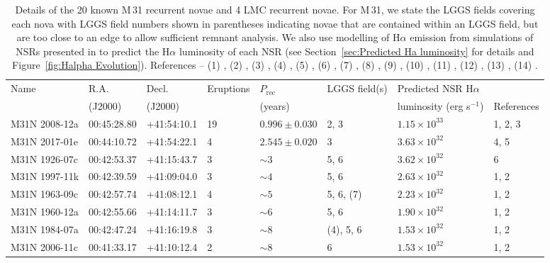 \documentclass[fleqn,usenatbib]{mnras}
\begin{document}
\begin{table}
\caption{Details of the 20 known M\,31 recurrent novae and 4 LMC recurrent novae. For M\,31, we state the LGGS fields covering each nova with LGGS field numbers shown in parentheses indicating novae that are contained within an LGGS field, but are too close to an edge to allow sufficient remnant analysis. We also use modelling of H$\alpha$ emission from simulations of NSRs presented in \citet{2023MNRAS.521.3004H} to predict the H$\alpha$ luminosity of each NSR (see Section~\ref{sec:Predicted Ha luminosity} for details and Figure~\ref{fig:Halpha Evolution}). References -- (1) \citet{2015ApJS..216...34S}, (2) \citet{2021gacv.workE..44D}, (3) \citet{2023ATel16361....1S}, (4) \citet{2017ATel10042....1W}, (5) \citet{2022RNAAS...6..241S}, (6) \citet{2022RNAAS...6..214S}, (7) \citet{2021ATel14750....1D}, (8) \citet{2023TNSTR3081....1X}, (9) \citet{2023ATel16354....1S}, (10) \citet{2020MNRAS.491..655K}, (11) \citet{2018ATel11384....1M}, (12) \citet{2016ApJ...818..145B}, (13) \citet{2004IAUC.8424....1B}, (14) \citet{2004IAUC.8424....2M}.}
\label{tab:M31,LMC-RNe}
\begin{center}
\begin{tabular}{llllllll}
\hline\hline
Name & R.A.\ & Decl.\ & Eruptions & $P_\mathrm{rec}$ & LGGS field(s) & Predicted NSR H$\alpha$ \\
& (J2000) & (J2000) & & (years) & & luminosity (erg s$^{-1}$) & References \\
\hline
M31N 2008-12a & 00:45:28.80 & +41:54:10.1 & 19 & $0.996\pm0.030$ & 2, 3 & $1.15 \times 10^{33}$ & 1, 2, 3 \\
M31N 2017-01e & 00:44:10.72 & +41:54:22.1 & 4 & $2.545\pm0.020$ & 3 & $3.63 \times 10^{32}$ & 4, 5 \\
M31N 1926-07c & 00:42:53.37 & +41:15:43.7 & 3 & $\sim3$ & 5, 6 & $3.62 \times 10^{32}$ & 6 \\
M31N 1997-11k & 00:42:39.59 & +41:09:04.0 & 3 & $\sim4$ & 5, 6 & $2.63 \times 10^{32}$ & 1, 2 \\
M31N 1963-09c & 00:42:57.74 & +41:08:12.1 & 4 & $\sim5$ & 5, 6, (7) & $2.23 \times 10^{32}$ & 1, 2\\
M31N 1960-12a & 00:42:55.66 & +41:14:11.7 & 3 & $\sim6$ & 5, 6 & $1.90 \times 10^{32}$ & 1, 2\\
M31N 1984-07a & 00:42:47.24 & +41:16:19.8 & 3 & $\sim8$ & (4), 5, 6 & $1.53 \times 10^{32}$ & 1, 2\\
M31N 2006-11c & 00:41:33.17 & +41:10:12.4 & 2 & $\sim8$ & 6 & $1.53 \times 10^{32}$ & 1, 2\\

\end{tabular}
\end{center}
\end{table}
\end{document}

